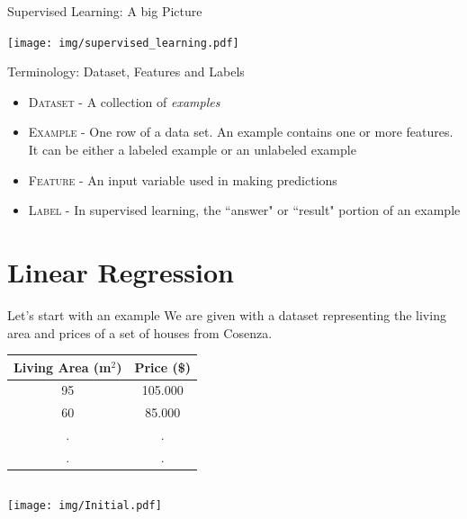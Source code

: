 \documentclass{beamer}
\begin{document}
\begin{frame}{Supervised Learning: A big Picture}
\begin{center}
\texttt{[image: img/supervised\_learning.pdf]}
\end{center}
\end{frame}

\begin{frame}{Terminology: Dataset, Features and Labels}
\Large
\begin{itemize}
	\item \textsc{Dataset} -  A collection of \textit{examples} 
    \item \textsc{Example} - One row of a data set. An example contains one or more features.
    	It can be either a labeled example or an unlabeled example
    \item \textsc{Feature} - An input variable used in making predictions
    \item \textsc{Label} - In supervised learning, the ``answer" or ``result" portion of an example
\end{itemize}

\end{frame}

\section{Linear Regression}
\begin{frame}
\tableofcontents[currentsection]
\end{frame}

\begin{frame}{Let's start with an example}
\small
We are given with a dataset representing the living area and prices
of a set of houses from Cosenza.

\begin{table}
\begin{tabular}{c|c}
Living Area (m$^2$) & Price (\$) \\ 
\hline
95 & 105.000 \\
60 & 85.000 \\
 . & . \\
 . & . 
\end{tabular}
\end{table}

\begin{columns}
\begin{column}{0.5\textwidth}
\texttt{[image: img/Initial.pdf]}
\end{column}
\begin{column}{0.5\textwidth}

\end{column}
\end{columns}
\end{frame}
\end{document}

